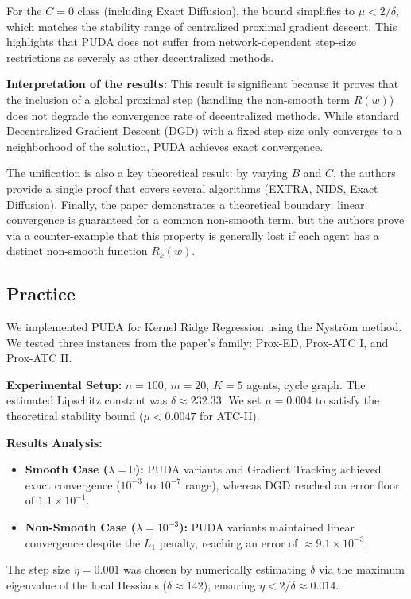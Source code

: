 \documentclass[10pt,english]{article}
\begin{document}
For the $C=0$ class (including Exact Diffusion), the bound simplifies to $\mu < 2/\delta$, which matches the stability range of centralized proximal gradient descent.
This highlights that PUDA does not suffer from network-dependent step-size restrictions as severely as other decentralized methods.

\textbf{Interpretation of the results:}
This result is significant because it proves that the inclusion of a global proximal step (handling the non-smooth term $R(w)$) does not degrade the convergence rate of decentralized methods.
While standard Decentralized Gradient Descent (DGD) with a fixed step size only converges to a neighborhood of the solution, PUDA achieves exact convergence.

The unification is also a key theoretical result: by varying $B$ and $C$, the authors provide a single proof that covers several algorithms (EXTRA, NIDS, Exact Diffusion).
Finally, the paper demonstrates a theoretical boundary: linear convergence is guaranteed for a common non-smooth term, but the authors prove via a counter-example that this property is generally lost if each agent has a distinct non-smooth function $R_k(w)$.

\subsection{Practice}

We implemented PUDA for Kernel Ridge Regression using the Nystr\"om method.
We tested three instances from the paper's family: Prox-ED, Prox-ATC I, and Prox-ATC II.

\textbf{Experimental Setup:}
$n = 100$, $m = 20$, $K = 5$ agents, cycle graph.
The estimated Lipschitz constant was $\delta \approx 232.33$.
We set $\mu = 0.004$ to satisfy the theoretical stability bound ($\mu < 0.0047$ for ATC-II).

\textbf{Results Analysis:}
\begin{itemize}
\item \textbf{Smooth Case ($\lambda = 0$):} PUDA variants and Gradient Tracking achieved exact convergence ($10^{-3}$ to $10^{-7}$ range), whereas DGD reached an error floor of $1.1 \times 10^{-1}$.
\item \textbf{Non-Smooth Case ($\lambda = 10^{-3}$):} PUDA variants maintained linear convergence despite the $L_1$ penalty, reaching an error of $\approx 9.1 \times 10^{-3}$.
\end{itemize}

The step size $\eta = 0.001$ was chosen by numerically estimating $\delta$ via the maximum eigenvalue of the local Hessians ($\delta \approx 142$), ensuring $\eta < 2/\delta \approx 0.014$.
\end{document}
